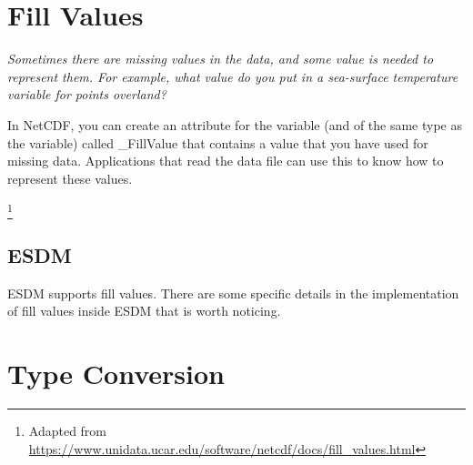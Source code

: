 
\section{Fill Values}

{\itshape
Sometimes there are missing values in the data, and some value is needed to represent them. For example, what value do you put in a sea-surface temperature variable for points overland?

In NetCDF, you can create an attribute for the variable (and of the same type as the variable) called \_FillValue that contains a value that you have used for missing data. Applications that read the data file can use this to know how to represent these values.
}\footnote{Adapted from \url{https://www.unidata.ucar.edu/software/netcdf/docs/fill_values.html}}

\subsection{ESDM}

ESDM supports fill values. There are some specific details in the implementation of fill values inside ESDM that is worth noticing.


\section{Type Conversion}

